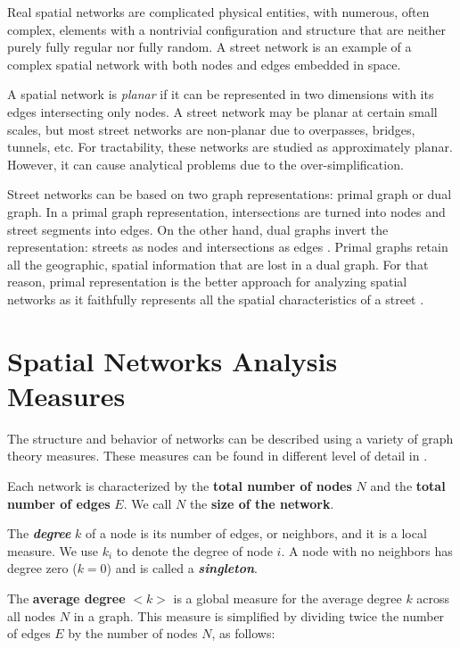 Real spatial networks are complicated physical entities, with numerous, often complex, elements with a nontrivial configuration and structure that are neither purely fully regular nor fully random. A street network is an example of a complex spatial network with both nodes and edges embedded in space.

A spatial network is \textit{planar} if it can be represented in two dimensions with its edges intersecting only nodes. A street network may be planar at certain small scales, but most street networks are non-planar due to overpasses, bridges, tunnels, etc. For tractability, these networks are studied as approximately planar. However, it can cause analytical problems due to the over-simplification.

Street networks can be based on two graph representations: primal graph or dual graph. In a primal graph representation, intersections are turned into nodes and street segments into edges. On the other hand, dual graphs invert the representation: streets as nodes and intersections as edges \cite{porta_streets_2006}. Primal graphs retain all the geographic, spatial information that are lost in a dual graph. For that reason, primal representation is the better approach for analyzing spatial networks as it faithfully represents all the spatial characteristics of a street \cite{ratti_spacesyntax_2004}.

\section{Spatial Networks Analysis Measures}

The structure and behavior of networks can be described using a variety of graph theory measures. These measures can be found in different level of detail in \cite{barabasi_2016, barthelemy_spatial_2011, lewis_2011, newman_2004, newman_2010, menczer_fortunato_davis_2020}.

Each network is characterized by the \textbf{total number of nodes} $N$ and the \textbf{total number of edges} $E$. We call $N$ the \textbf{size of the network}. 

The \textbf{\textit{degree}} $k$ of a node is its number of edges, or neighbors, and it is a local measure. We use $k_i$ to denote the degree of node $i$. A node with no neighbors has degree zero ($k = 0$) and is called a \textbf{\textit{singleton}}.

The \textbf{average degree} $<k>$ is a global measure for the average degree $k$ across all nodes $N$ in a graph. This measure is simplified by dividing twice the number of edges $E$ by the number of nodes $N$, as follows:

